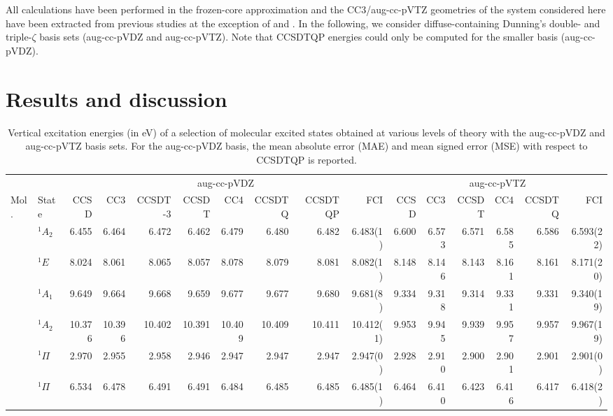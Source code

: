 \documentclass[aip,jcp,reprint,noshowkeys,superscriptaddress]{revtex4-1}
\newcommand{\mc}{\multicolumn}
\begin{document}
All calculations have been performed in the frozen-core approximation and the CC3/aug-cc-pVTZ geometries of the system considered here have been extracted from previous studies at the exception of  and .
In the following, we consider diffuse-containing Dunning's double- and triple-$\zeta$ basis sets (aug-cc-pVDZ and aug-cc-pVTZ).
Note that CCSDTQP energies could only be computed for the smaller basis (aug-cc-pVDZ).

\section{Results and discussion}


\begin{squeezetable}
\begin{table}
	\caption{Vertical excitation energies (in eV) of a selection of molecular excited states obtained at various levels of theory with the aug-cc-pVDZ and aug-cc-pVTZ basis sets. 
	For the aug-cc-pVDZ basis, the mean absolute error (MAE) and mean signed error (MSE) with respect to CCSDTQP is reported.
	\label{tab:BigTab}}
	\begin{ruledtabular}
	\begin{tabular}{llrrrrrrrrrrrrrr}
				&		&	\mc{8}{c}{aug-cc-pVDZ}		&		\mc{6}{c}{aug-cc-pVTZ}		\\	
				\cline{3-10} \cline{11-16}
	Mol.	&	State				&CCSD	&CC3	&CCSDT-3&CCSDT	&CC4	&CCSDTQ	&CCSDTQP	&FCI	
									&CCSD	&CC3	&CCSDT	&CC4	&CCSDTQ	&FCI			\\
	\hline
	\ce{NH3}	&	$^1A_2$ 		&6.455	&6.464	&6.472	&6.462	&6.479	&6.480	&6.482	&6.483(1)	&6.600	&6.573	&6.571	&6.585	&6.586	&6.593(22)	\\	
				&	$^1E$			&8.024	&8.061	&8.065	&8.057	&8.078	&8.079	&8.081	&8.082(1)	&8.148	&8.146	&8.143	&8.161	&8.161	&8.171(20)	\\	
				&	$^1A_1$ 		&9.649	&9.664	&9.668	&9.659	&9.677	&9.677	&9.680	&9.681(8)	&9.334	&9.318	&9.314	&9.331	&9.331	&9.340(19)	\\
				&	$^1A_2$ 		&10.376	&10.396	&10.402	&10.391	&10.409	&10.409	&10.411	&10.412(1)	&9.953	&9.945	&9.939	&9.957	&9.957	&9.967(19)	\\
	\ce{BH}		&	$^1\Pi$ 		&2.970	&2.955	&2.958	&2.946	&2.947	&2.947	&2.947	&2.947(0)	&2.928	&2.910	&2.900	&2.901	&2.901	&2.901(0)	\\
	\ce{BF}		&	$^1\Pi$ 		&6.534	&6.478	&6.491	&6.491	&6.484	&6.485	&6.485	&6.485(1)	&6.464	&6.410	&6.423	&6.416	&6.417	&6.418(2)\\

\end{tabular}
\end{ruledtabular}
\end{table}
\end{squeezetable}
\end{document}
